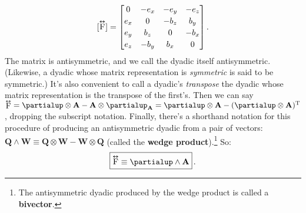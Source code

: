 \documentclass[12pt]{article}
\renewcommand{\vv}[1]{\mathbf{#1}}
\newcommand{\tightoverset}[2]{%
  \mathop{#2}\limits^{\vbox to -.5ex{\kern-0.75ex\hbox{$#1$}\vss}}}
\newcommand{\inlinedy}[1]{\tightoverset{\text{\tiny$\bm\leftrightarrow$}}{#1}}
\newcommand{\capdy}[1]{ \overset{ \text{\tiny$\bm\leftrightarrow$} }{\vphantom{\text{\small{A}}}\smash{#1}} }
\begin{document}
\begin{equation}\label{eq:emt}
[\capdy{\mathrm{F}}]
=
\begin{bmatrix}
0 & -e_x & -e_y & -e_z \\[.5ex]
e_x & 0 & -b_z & b_y \\[.5ex]
e_y & b_z & 0 & -b_x \\[.5ex]
e_z & -b_y & b_x & 0
\end{bmatrix} .
\end{equation}
The matrix is antisymmetric, and we call the dyadic itself antisymmetric. (Likewise, a dyadic whose matrix representation is \emph{symmetric} is said to be symmetric.) It's also convenient to call a dyadic's \emph{transpose} the dyadic whose matrix representation is the transpose of the first's. Then we can say ${\inlinedy{\mathrm{F}} = \partialup \otimes \vv A - \vv A \otimes \partialup_{\vv A} = \partialup \otimes \vv A - (\partialup \otimes \vv A)^\mathrm{T}}$, dropping the subscript notation. Finally, there's a shorthand notation for this procedure of producing an antisymmetric dyadic from a pair of vectors: $\vv Q \wedge \vv W \equiv \vv Q \otimes \vv W - \vv W \otimes \vv Q$ (called the \textbf{wedge product}).\footnote{The antisymmetric dyadic produced by the wedge product is called a \textbf{bivector}.} So:
\begin{equation}\label{eq:emta}
\boxed{ \vphantom{A_{A_A}} \capdy{\mathrm{F}} \equiv \partialup \wedge \vv A } \, . 
\end{equation}
\end{document}
